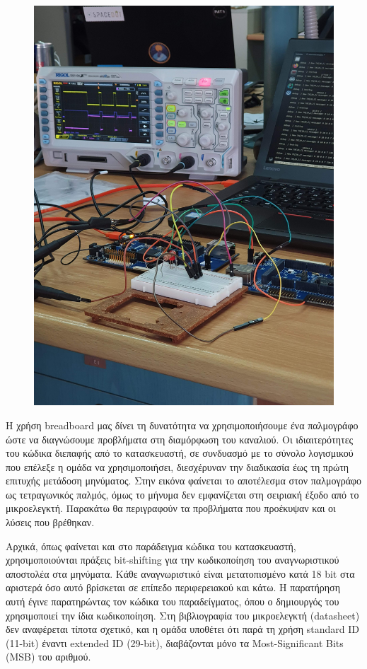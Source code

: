 \documentclass[a4paper,nobib,justified]{tufte-book}
\begin{document}
\begin{figure}[ht]
	\includegraphics[angle=270,origin=c]{media/images/lab-wiring-scope.jpg}
\end{figure}

Η χρήση breadboard μας δίνει τη δυνατότητα να χρησιμοποιήσουμε ένα παλμογράφο ώστε να διαγνώσουμε προβλήματα στη διαμόρφωση του καναλιού. Οι ιδιαιτερότητες του κώδικα διεπαφής από το κατασκευαστή, σε συνδυασμό με το σύνολο λογισμικού που επέλεξε η ομάδα να χρησιμοποιήσει, διεσχέρυναν την διαδικασία έως τη πρώτη επιτυχής μετάδοση μηνύματος. Στην εικόνα φαίνεται το αποτέλεσμα στον παλμογράφο ως τετραγωνικός παλμός, όμως το μήνυμα δεν εμφανίζεται στη σειριακή έξοδο από το μικροελεγκτή. Παρακάτω θα περιγραφούν τα προβλήματα που προέκυψαν και οι λύσεις που βρέθηκαν.

Αρχικά, όπως φαίνεται και στο παράδειγμα κώδικα του κατασκευαστή, χρησιμοποιούνται πράξεις bit-shifting για την κωδικοποίηση του αναγνωριστικού αποστολέα στα μηνύματα. Κάθε αναγνωριστικό είναι μετατοπισμένο κατά 18 bit στα αριστερά όσο αυτό βρίσκεται σε επίπεδο περιφερειακού και κάτω. Η παρατήρηση αυτή έγινε παρατηρώντας τον κώδικα του παραδείγματος, όπου ο δημιουργός του χρησιμοποιεί την ίδια κωδικοποίηση. Στη βιβλιογραφία του μικροελεγκτή (datasheet) δεν αναφέρεται τίποτα σχετικό, και η ομάδα υποθέτει ότι παρά τη χρήση standard ID (11-bit) έναντι extended ID (29-bit), διαβάζονται μόνο τα Most-Significant Bits (MSB) του αριθμού.
\end{document}
